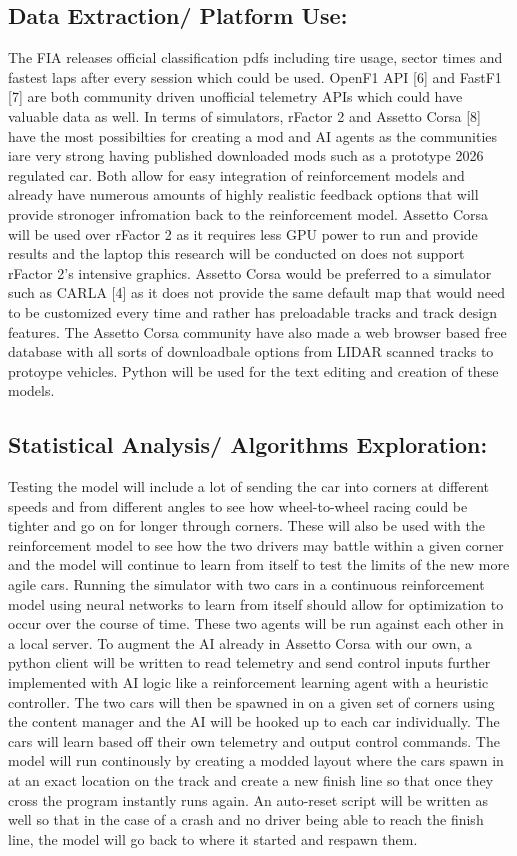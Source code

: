 \documentclass[11pt]{article} %
\begin{document}
\subsection {Data Extraction/ Platform Use:} The FIA releases official classification pdfs including tire usage, sector times and fastest laps after every session which could be used. OpenF1 API [6] and FastF1 [7] are both community driven unofficial telemetry APIs which could have valuable data as well. In terms of simulators, rFactor 2 and Assetto Corsa [8] have the most possibilties for creating a mod and AI agents as the communities iare very strong having published downloaded mods such as a prototype 2026 regulated car. Both allow for easy integration of reinforcement models and already have numerous amounts of highly realistic feedback options that will provide stronoger infromation back to the reinforcement model.  Assetto Corsa will be used over rFactor 2 as it requires less GPU power to run and provide results and the laptop this research will be conducted on does not support rFactor 2's intensive graphics. Assetto Corsa would be preferred to a simulator such as CARLA [4] as it does not provide the same default map that would need to be customized every time and rather has preloadable tracks and track design features. The Assetto Corsa community have also made a web browser based free database with all sorts of downloadbale options from LIDAR scanned tracks to protoype vehicles. Python will be used for the text editing and creation of these models.

\subsection {Statistical Analysis/ Algorithms Exploration:} Testing the model will include a lot of sending the car into corners at different speeds and from different angles to see how wheel-to-wheel racing could be tighter and go on for longer through corners. These will also be used with the reinforcement model to see how the two drivers may battle within a given corner and the model will continue to learn from itself to test the limits of the new more agile cars. Running the simulator with two cars in a continuous reinforcement model using neural networks to learn from itself should allow for optimization to occur over the course of time. These two agents will be run against each other in a local server. To augment the AI already in Assetto Corsa with our own, a python client will be written to read telemetry and send control inputs further implemented with AI logic like a reinforcement learning agent with a heuristic controller. The two cars will then be spawned in on a given set of corners using the content manager and the AI will be hooked up to each car individually. The cars will learn based off their own telemetry and output control commands. The model will run continously by creating a modded layout where the cars spawn in at an exact location on the track and create a new finish line so that once they cross the program instantly runs again. An auto-reset script will be written as well so that in the case of a crash and no driver being able to reach the finish line, the model will go back to where it started and respawn them.
\end{document}
